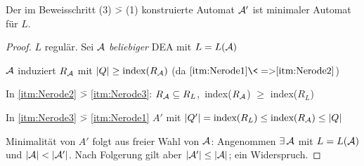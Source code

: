 %
\setcounter{Korollar}{4}
\begin{Korollar}
        Der im Beweisschritt (3) \=> (1) konstruierte Automat $\mathcal{A}'$ ist minimaler Automat für $L$.
\end{Korollar}
\begin{proof}
        $L$ regulär. Sei $\mathcal{A}$ \emph{beliebiger} \ac{DEA} mit $L=L(\mathcal{A})$

        $\mathcal{A}$ induziert $R_{\mathcal{A}}$ mit $|Q|\geq\text{index}(R_{\mathcal{A}})$ (da $\ref{itm:Nerode1} {\<=>} \ref{itm:Nerode2}$)

        In \ref{itm:Nerode2} \=> \ref{itm:Nerode3}: $R_{\mathcal{A}}\subseteq R_L$,\ index($R_{\mathcal{A}}$) $\geq$ index($R_L$)

        In \ref{itm:Nerode3} \=> \ref{itm:Nerode1} $A'$ mit $|Q'|=\text{index}(R_L) \leq \text{index}(R_{\mathcal{A}})\leq |Q|$
        
        Minimalität von $A'$ folgt aus freier Wahl von $\mathcal{A}$: 
  Angenommen $\exists\,\mathcal{A}$ mit $L=L(\mathcal{A})$ und $|\A|<|\A'|$.
  Nach Folgerung gilt aber $|\mathcal{A}'| \leq |\mathcal{A}|$; ein Widerspruch.
\end{proof}

